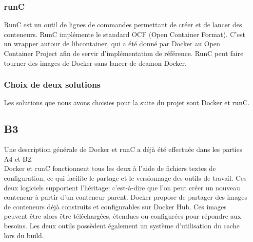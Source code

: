     \subsubsection{runC}
    RunC est un outil de lignes de commandes permettant de créer et de lancer des conteneurs. RunC implémente le standard OCF (Open Container Format). C'est un wrapper autour de libcontainer, qui a été donné par Docker au Open Container Project afin de servir d'implémentation de référence. RunC peut faire tourner des images de Docker sans lancer de deamon Docker.


    \subsubsection{Choix de deux solutions}
    Les solutions que nous avons choisies pour la suite du projet sont Docker et runC.

\subsection{B3}
    Une description générale de Docker et runC a déjà été effectuée dans les parties A4 et B2.\\

    Docker et runC fonctionnent tous les deux à l'aide de fichiers textes de configuration, ce qui facilite le partage et le versionnage des outils de travail. Ces deux logiciels supportent l'héritage: c'est-à-dire que l'on peut créer un nouveau conteneur à partir d'un conteneur parent. Docker propose de partager des images de conteneurs déjà construits et configurables sur Docker Hub. Ces images peuvent être alors être téléchargées, étendues ou configurées pour répondre aux besoins. Les deux outils possèdent également un système d'utilisation du cache lors du build.

